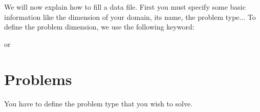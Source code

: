 We will now explain how to fill a data file.
First you must specify some basic information like the dimension of your domain, its name, the problem type...
To define the problem dimension, we use the following keyword:

    \begin{center}
    \end{center}
or
    \begin{center}
    \end{center}


\section{Problems} \label{pbs}
You have to define the problem type that you wish to solve.

    \begin{center}
    \end{center}

